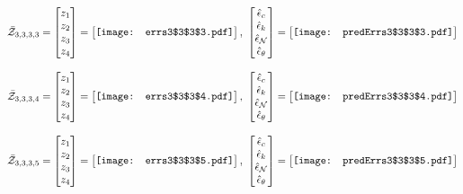\documentclass[12pt]{article}
\begin{document}
\begin{gather*}
\bar{\mathcal{Z}}_{3,3,3,3}=\begin{bmatrix}
z_1\\
z_2\\
z_3\\
z_4
 \end{bmatrix}= \begin{bmatrix}
\vcenter{\hbox{\texttt{[image: errs3\$3\$3\$3.pdf]}}}
 \end{bmatrix},\,\, \begin{bmatrix}
\hat{\epsilon}_c\\\hat{\epsilon}_k\\\hat{\epsilon}_\mathcal{N}\\\hat{\epsilon}_\theta
 \end{bmatrix}=\begin{bmatrix}
\vcenter{\hbox{\texttt{[image: predErrs3\$3\$3\$3.pdf]}}}
 \end{bmatrix}
\end{gather*}


\begin{gather*}
\bar{\mathcal{Z}}_{3,3,3,4}=\begin{bmatrix}
z_1\\
z_2\\
z_3\\
z_4
 \end{bmatrix}= \begin{bmatrix}
\vcenter{\hbox{\texttt{[image: errs3\$3\$3\$4.pdf]}}}
 \end{bmatrix},\,\, \begin{bmatrix}
\hat{\epsilon}_c\\\hat{\epsilon}_k\\\hat{\epsilon}_\mathcal{N}\\\hat{\epsilon}_\theta
 \end{bmatrix}=\begin{bmatrix}
\vcenter{\hbox{\texttt{[image: predErrs3\$3\$3\$4.pdf]}}}
 \end{bmatrix}
\end{gather*}

\begin{gather*}
\bar{\mathcal{Z}}_{3,3,3,5}=\begin{bmatrix}
z_1\\
z_2\\
z_3\\
z_4
 \end{bmatrix}= \begin{bmatrix}
\vcenter{\hbox{\texttt{[image: errs3\$3\$3\$5.pdf]}}}
 \end{bmatrix},\,\, \begin{bmatrix}
\hat{\epsilon}_c\\\hat{\epsilon}_k\\\hat{\epsilon}_\mathcal{N}\\\hat{\epsilon}_\theta
 \end{bmatrix}=\begin{bmatrix}
\vcenter{\hbox{\texttt{[image: predErrs3\$3\$3\$5.pdf]}}}
 \end{bmatrix}
\end{gather*}
\end{document}
